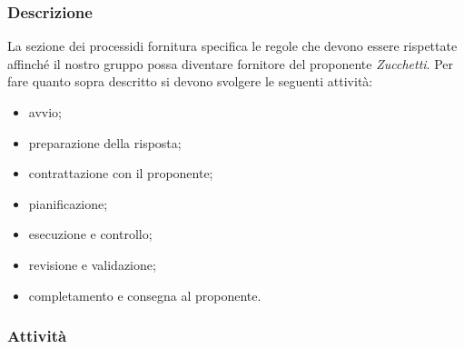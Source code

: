 		\subsubsection{Descrizione}
		La sezione dei processi\glosp di fornitura specifica le regole che devono essere rispettate affinché il nostro gruppo possa diventare fornitore del proponente \textit{Zucchetti}.
		Per fare quanto sopra descritto si devono svolgere le seguenti attività:
		\begin{itemize}
			\item avvio;
			\item preparazione della risposta;
			\item contrattazione con il proponente;
			\item pianificazione;
			\item esecuzione e controllo;
			\item revisione e validazione;
			\item completamento e consegna al proponente.
		\end{itemize}
		\subsubsection{Attività}
